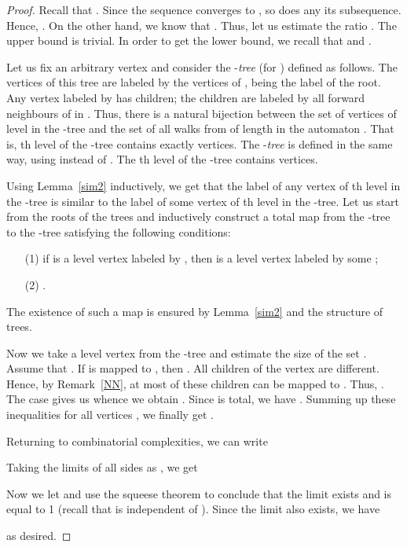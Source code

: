 \documentclass[submission,copyright]{eptcs}\providecommand{\event}{WORDS 2011}
\begin{document}
\begin{proof} 
Recall that . Since the sequence  converges to , so does any its subsequence. Hence, . On the other hand, we know that . Thus, let us estimate the ratio . The upper bound  is trivial. In order to get the lower bound, we recall that  and . 

Let us fix an arbitrary vertex  and consider the -\textit{tree} (for ) defined as follows. The vertices of this tree are labeled by the vertices of ,  being the label of the root. Any vertex labeled by  has  children; the children are labeled by all forward neighbours of  in . Thus, there is a natural bijection between the set of vertices of level  in the -tree and the set of all walks from  of length  in the automaton . That is, th level of the -tree contains exactly  vertices. The -\textit{tree} is defined in the same way, using  instead of . The th level of the -tree contains  vertices.

Using Lemma~\ref{sim2} inductively, we get that the label of any vertex of th level in the -tree is similar to the label of some vertex of th level in the -tree. Let us start from the roots of the trees and inductively construct a total map  from the -tree to the -tree satisfying the following conditions:
\begin{itemize}
\item[(1)] if  is a level  vertex labeled by , then  is a level  vertex labeled by some ;
\item[(2)] .
\end{itemize}
The existence of such a map is ensured by Lemma~\ref{sim2} and the structure of trees. 

Now we take a level  vertex  from the -tree and estimate the size of the set . Assume that . If  is mapped to , then . All children of the vertex  are different. Hence, by Remark~\ref{NN}, at most  of these children can be mapped to . Thus, . The case  gives us  whence we obtain . Since  is total, we have . Summing up these inequalities for all vertices , we finally get .

Returning to combinatorial complexities, we can write

Taking the limits of all sides as , we get

Now we let  and use the squeese theorem to conclude that the limit  exists and is equal to 1 (recall that  is independent of ). Since the limit  also exists, we have

as desired.
\end{proof}
\end{document}

